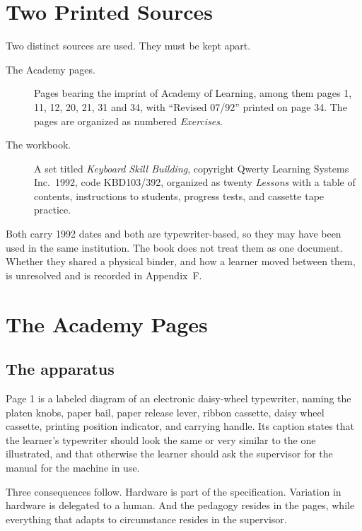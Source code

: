 \section{Two Printed Sources}

Two distinct sources are used. They must be kept apart.

\begin{description}
\item[The Academy pages.] Pages bearing the imprint of Academy of Learning, among them pages 1, 11, 12, 20, 21, 31 and 34, with ``Revised 07/92'' printed on page 34. The pages are organized as numbered \emph{Exercises}.
\item[The workbook.] A set titled \emph{Keyboard Skill Building}, copyright Qwerty Learning Systems Inc.\ 1992, code KBD103/392, organized as twenty \emph{Lessons} with a table of contents, instructions to students, progress tests, and cassette tape practice.
\end{description}

Both carry 1992 dates and both are typewriter-based, so they may have been used in the same institution.  The book does not treat them as one document. Whether they shared a physical binder, and how a learner moved between them, is unresolved and is recorded in Appendix~F.

\section{The Academy Pages}

\subsection{The apparatus}

Page 1 is a labeled diagram of an electronic daisy-wheel typewriter, naming the platen knobs, paper bail, paper release lever, ribbon cassette, daisy wheel cassette, printing position indicator, and carrying handle. Its caption states that the learner's typewriter should look the same or very similar to the one illustrated, and that otherwise the learner should ask the supervisor for the manual for the machine in use.

Three consequences follow. Hardware is part of the specification. Variation in hardware is delegated to a human. And the pedagogy resides in the pages, while everything that adapts to circumstance resides in the supervisor.

